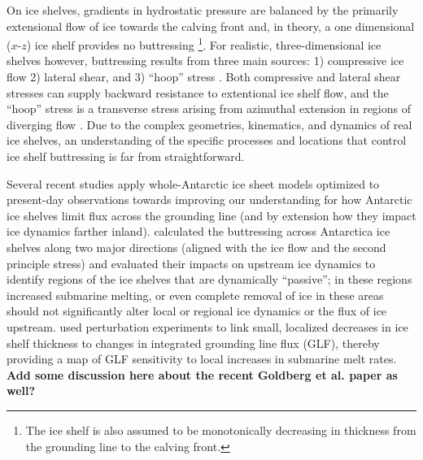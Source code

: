 \documentclass[review,oneside]{igs}
\begin{document}
On ice shelves, gradients in hydrostatic pressure are balanced by the primarily extensional flow of ice towards the calving front \citep{hutter1983, morland1987, schoof2007} and, in theory, a one  dimensional ($x$-$z$) ice shelf provides no buttressing \citep{schoof2007,gudmundsson2013}\footnote{The ice shelf is also assumed to be monotonically decreasing in thickness from the grounding line to the calving front.}. For realistic, three-dimensional ice shelves however,  buttressing results from three main sources: 1) compressive ice flow 2) lateral shear, and 3) ``hoop'' stress \citep{pegler2012}. Both compressive and lateral shear stresses can supply backward resistance to extentional ice shelf flow, and the ``hoop'' stress is a transverse stress arising from azimuthal extension in regions of diverging flow \citep{wearing2016}.  Due to the complex geometries, kinematics, and dynamics of real ice shelves, an understanding of the specific processes and locations that control ice shelf buttressing is far from straightforward.



Several recent studies apply whole-Antarctic ice sheet models optimized to present-day observations towards improving our understanding for how Antarctic ice shelves limit flux across the grounding line (and by extension how they impact ice dynamics farther inland). \cite{furst2016} calculated the buttressing across Antarctica ice shelves along two major directions (aligned with the ice flow and the second principle stress) and evaluated their impacts on upstream ice dynamics to identify regions of the ice shelves that are dynamically ``passive''; in these regions increased submarine melting, or even complete removal of ice in these areas should not significantly alter local or regional ice dynamics or the flux of ice upstream. \cite{reese2018} used perturbation experiments to link small, localized decreases in ice shelf thickness to changes in integrated grounding line flux (GLF), thereby providing a map of GLF sensitivity to local increases in submarine melt rates. \textbf{Add some discussion here about the recent Goldberg et al. paper as well?}
\end{document}
